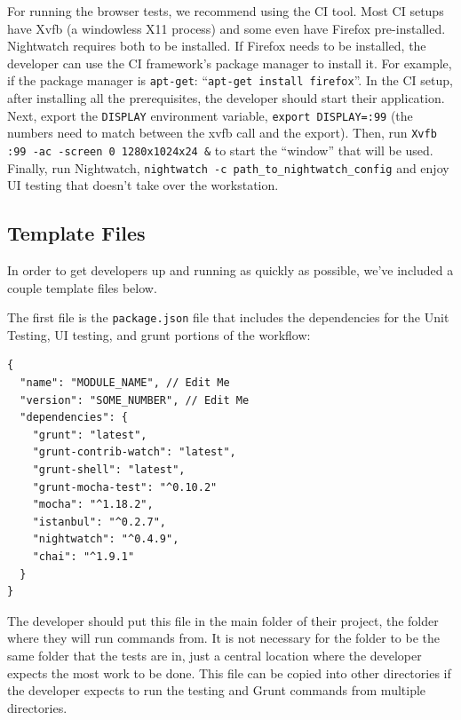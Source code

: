 \documentclass[12pt]{ucthesis}
\begin{document}
For running the browser tests, we recommend using the CI tool. Most CI setups have Xvfb (a windowless X11 process) and some even have Firefox pre-installed. Nightwatch requires both to be installed. If Firefox needs to be installed, the developer can use the CI framework's package manager to install it. For example, if the package manager is \lstinline{apt-get}: ``\lstinline{apt-get install firefox}''. In the CI setup, after installing all the prerequisites, the developer should start their application. Next, export the \lstinline{DISPLAY} environment variable, \lstinline{export DISPLAY=:99} (the numbers need to match between the xvfb call and the export). Then, run \lstinline{Xvfb :99 -ac -screen 0 1280x1024x24 &} to start the ``window'' that will be used. Finally, run Nightwatch, \lstinline{nightwatch -c path_to_nightwatch_config} and enjoy UI testing that doesn't take over the workstation.

\subsection{Template Files}
In order to get developers up and running as quickly as possible, we've included a couple template files below.

The first file is the \lstinline{package.json} file that includes the dependencies for the Unit Testing, UI testing, and grunt portions of the workflow:
\begin{lstlisting}
{
  "name": "MODULE_NAME", // Edit Me
  "version": "SOME_NUMBER", // Edit Me
  "dependencies": {
    "grunt": "latest",
    "grunt-contrib-watch": "latest",
    "grunt-shell": "latest",
    "grunt-mocha-test": "^0.10.2"
    "mocha": "^1.18.2",
    "istanbul": "^0.2.7",
    "nightwatch": "^0.4.9",
    "chai": "^1.9.1"
  }
}
\end{lstlisting}
The developer should put this file in the main folder of their project, the folder where they will run commands from. It is not necessary for the folder to be the same folder that the tests are in, just a central location where the developer expects the most work to be done. This file can be copied into other directories if the developer expects to run the testing and Grunt commands from multiple directories.
\end{document}
